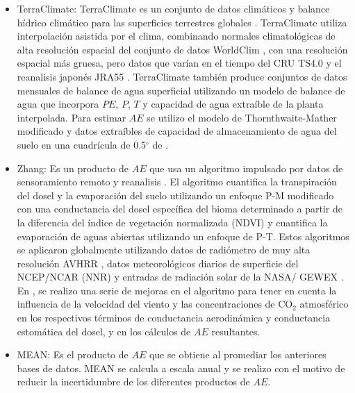 \documentclass[12pt]{article}
\begin{document}
\begin{itemize}
	\item TerraClimate: TerraClimate es un conjunto de datos climáticos y balance hídrico climático para las superficies terrestres globales \citep{abatzoglou2018terraclimate}. TerraClimate utiliza interpolación asistida por el clima, combinando normales climatológicas de alta resolución espacial del conjunto de datos WorldClim \citep{fick2017worldclim}, con una resolución espacial más gruesa, pero datos que varían en el tiempo del CRU TS4.0 \citep{harris2014updated} y el reanalisis japonés JRA55 \citep{kobayashi2015jra}. TerraClimate también produce conjuntos de datos mensuales de balance de agua superficial utilizando un modelo de balance de agua que incorpora $PE$, $P$, $T$ y capacidad de agua extraíble de la planta interpolada. Para estimar $AE$ se utilizo el modelo de Thornthwaite-Mather \citep[T-M;][]{willmott1985climatology} modificado y datos extraíbles de capacidad de almacenamiento de agua del suelo en una cuadrícula de 0.5$^{\circ}$ de \citet{wang2016global}.
	
	\item Zhang: Es un producto de $AE$ que usa un algoritmo impulsado por datos de sensoramiento remoto y reanalisis \citep{zhang2010continuous}. El algoritmo cuantifica la transpiración del dosel y la evaporación del suelo utilizando un enfoque P-M modificado con una conductancia del dosel específica del bioma determinado a partir de la diferencia del índice de vegetación normalizada (NDVI) y cuantifica la evaporación de aguas abiertas utilizando un enfoque de P-T. Estos algoritmos se aplicaron globalmente utilizando datos de radiómetro de muy alta resolución AVHRR \citep{tucker2005extended}, datos meteorológicos diarios de superficie del NCEP/NCAR (NNR) \citep{kistler2001ncep} y entradas de radiación solar de la NASA/ GEWEX \citep{pinker1992modeling}. En \citet{zhang2015vegetation}, se realizo una serie de mejoras en el algoritmo para tener en cuenta la influencia de la velocidad del viento y las concentraciones de CO$_{2}$ atmosférico en los respectivos términos de conductancia aerodinámica y conductancia estomática del dosel, y en los cálculos de $AE$ resultantes.
	
	\item MEAN: Es el producto de $AE$ que se obtiene al promediar los anteriores bases de datos. MEAN se calcula a escala anual y se realizo con el motivo de reducir la incertidumbre de los diferentes productos de $AE$. 
	
\end{itemize}
\end{document}
